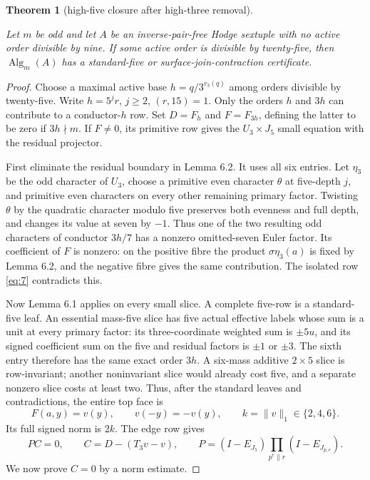 \documentclass[11pt]{amsart}
\newtheorem{theorem}{Theorem}
\numberwithin{theorem}{section}
\theoremstyle{remark}
\numberwithin{equation}{section}
\begin{document}
\begin{theorem}[high-five closure after high-three removal]\label{theorem:7.3}

Let \(m\) be odd and let \(A\) be an inverse-pair-free Hodge sextuple
with no active order divisible by nine. If some active order is divisible
by twenty-five, then \(\operatorname{Alg}_m(A)\) has a standard-five or
surface-join-contraction certificate.

\end{theorem}
\begin{proof}

Choose a maximal active base \(h=q/3^{v_3(q)}\) among orders divisible
by twenty-five. Write \(h=5^jr\), \(j\ge2\), \((r,15)=1\). Only the
orders \(h\) and \(3h\) can contribute to a conductor-\(h\) row. Set
\(D=F_h\) and \(F=F_{3h}\), defining the latter to be zero if
\(3h\nmid m\). If \(F\ne0\), its primitive row gives the
\(U_3\times J_5\) small equation with the residual projector.

First eliminate the residual boundary in Lemma 6.2. It uses all six
entries. Let \(\eta_3\) be the odd character of \(U_3\), choose a
primitive even character \(\theta\) at five-depth \(j\), and primitive
even characters on every other remaining primary factor. Twisting
\(\theta\) by the quadratic character modulo five preserves both
evenness and full depth, and changes its value at seven by \(-1\).
Thus one of the two resulting odd characters of conductor \(3h/7\) has
a nonzero omitted-seven Euler factor. Its coefficient of \(F\) is
nonzero: on the positive fibre the product \(\sigma\eta_3(a)\) is fixed
by Lemma 6.2, and the negative fibre gives the same contribution. The
isolated row \eqref{eq:7} contradicts this.

Now Lemma 6.1 applies on every small slice. A complete five-row is a
standard-five leaf. An essential mass-five slice has five actual effective
labels whose sum is a unit at every primary factor: its three-coordinate
weighted sum is \(\pm5u\), and its signed coefficient sum on the five
and residual factors is \(\pm1\) or \(\pm3\). The sixth entry therefore
has the same exact order \(3h\). A six-mass additive \(2\times5\) slice
is row-invariant; another noninvariant slice would already cost five, and
a separate nonzero slice costs at least two. Thus, after the standard
leaves and contradictions, the entire top face is
\[
F(a,y)=v(y),\qquad v(-y)=-v(y),\qquad k=\|v\|_1\in\{2,4,6\}.
\]
Its full signed norm is \(2k\). The edge row gives
\[
PC=0,\qquad C=D-(T_3v-v),\qquad
P=(I-E_{J_5})\prod_{p^e\parallel r}(I-E_{J_{p,e}}).
\tag{9}\label{eq:9}
\]
We now prove \(C=0\) by a norm estimate.


\end{proof}
\end{document}
